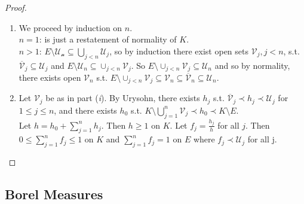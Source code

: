 \documentclass{article}
\begin{document}
\begin{proof}
    \begin{enumerate}[label = (\roman*), align = left]
        \item We proceed by induction on $n$.\\
        
        \noindent\underline{$n=1$}: is just a restatement of normality of $K$.\\

         \noindent\underline{$n>1$}: $E\setminus\mathcal{U_n}\subseteq \displaystyle\bigcup_{j<n}\mathcal{U}_j$, so by induction there exist open sets $\mathcal{V}_j, j<n$, s.t. $\overline{\mathcal{V}}_j\subseteq\mathcal{U}_j$ and $E\setminus \mathcal{U}_n \subseteq \displaystyle\cup _{j<n}\mathcal{V}_j$. So $E\setminus\displaystyle\cup _{j<n}\mathcal{V}_j\subseteq \mathcal{U}_n$ and so by normality, there exists open $\mathcal{V}_n$ s.t. $E\setminus\displaystyle\cup _{j<n}\mathcal{V}_j\subseteq \mathcal{V}_n\subseteq\overline{\mathcal{V}}_n\subseteq\mathcal{U}_n$.

         \item Let $\mathcal{V}_j$ be as in part (\textit{i}). By Urysohn, there exists $h_j$ s.t. $\overline{\mathcal{V}}_j\prec h_j \prec \mathcal{U}_j$ for $1\leq j \leq n$, and there exists $h_0$ s.t. $K\setminus \displaystyle\bigcup^n_{j=1}\mathcal{V}_j\prec h_0\prec K\setminus E$.\\
         Let $h = h_0 +\displaystyle\sum_{j=1}^n h_j$. Then $h\geq 1$ on $K$. Let $f_j = \frac{h_j}{h}$ for all $j$. Then $0\leq \displaystyle\sum_{j=1}^n f_j \leq 1$ on $K$ and $\displaystyle\sum_{j=1}^n f_j=1$ on $E$ where $f_j\prec \mathcal{U}_j$ for all j.
    \end{enumerate}
\end{proof}

\subsection{Borel Measures}
\end{document}
